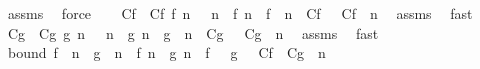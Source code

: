 \begin{isabellebody}
\ assms\ \isamarkupfalse%
\ force\isanewline
\isanewline
\ \ \isamarkupfalse%
\ C{\isacharunderscore}{\kern0pt}f\ \ C{\isacharunderscore}{\kern0pt}f{\isacharcolon}{\kern0pt}\ {\isachardoublequoteopen}{\isasymbar}f\ {\isacharparenleft}{\kern0pt}n\ {\isacharplus}{\kern0pt}\ {\isacharparenleft}{\kern0pt}{\isacharminus}{\kern0pt}\ n{\isacharparenright}{\kern0pt}{\isacharparenright}{\kern0pt}\ {\isacharminus}{\kern0pt}\ {\isacharparenleft}{\kern0pt}f\ n\ {\isacharplus}{\kern0pt}\ f\ {\isacharparenleft}{\kern0pt}{\isacharminus}{\kern0pt}\ n{\isacharparenright}{\kern0pt}{\isacharparenright}{\kern0pt}{\isasymbar}\ {\isasymle}\ C{\isacharunderscore}{\kern0pt}f{\isachardoublequoteclose}\ {\isachardoublequoteopen}{}\ {\isasymle}\ C{\isacharunderscore}{\kern0pt}f{\isachardoublequoteclose}\ \ n\ \isamarkupfalse%
\ assms\ \isamarkupfalse%
\ fast\isanewline
\isanewline
\ \ \isamarkupfalse%
\ C{\isacharunderscore}{\kern0pt}g\ \ C{\isacharunderscore}{\kern0pt}g{\isacharcolon}{\kern0pt}\ {\isachardoublequoteopen}{\isasymbar}g\ {\isacharparenleft}{\kern0pt}n\ {\isacharplus}{\kern0pt}\ {\isacharparenleft}{\kern0pt}{\isacharminus}{\kern0pt}\ n{\isacharparenright}{\kern0pt}{\isacharparenright}{\kern0pt}\ {\isacharminus}{\kern0pt}\ {\isacharparenleft}{\kern0pt}g\ n\ {\isacharplus}{\kern0pt}\ g\ {\isacharparenleft}{\kern0pt}{\isacharminus}{\kern0pt}\ n{\isacharparenright}{\kern0pt}{\isacharparenright}{\kern0pt}{\isasymbar}\ {\isasymle}\ C{\isacharunderscore}{\kern0pt}g{\isachardoublequoteclose}\ {\isachardoublequoteopen}{}\ {\isasymle}\ C{\isacharunderscore}{\kern0pt}g{\isachardoublequoteclose}\ \ n\ \isamarkupfalse%
\ assms\ \isamarkupfalse%
\ fast\isanewline
\ \ \isanewline
\ \ \isamarkupfalse%
\ bound{\isacharcolon}{\kern0pt}\ {\isachardoublequoteopen}{\isasymbar}f\ {\isacharparenleft}{\kern0pt}{\isacharminus}{\kern0pt}\ n{\isacharparenright}{\kern0pt}\ {\isacharminus}{\kern0pt}\ g\ {\isacharparenleft}{\kern0pt}{\isacharminus}{\kern0pt}\ n{\isacharparenright}{\kern0pt}{\isasymbar}\ {\isasymle}\ {\isasymbar}f\ n\ {\isacharminus}{\kern0pt}\ g\ n{\isasymbar}\ {\isacharplus}{\kern0pt}\ {\isasymbar}f\ {}{\isasymbar}\ {\isacharplus}{\kern0pt}\ {\isasymbar}g\ {}{\isasymbar}\ {\isacharplus}{\kern0pt}\ C{\isacharunderscore}{\kern0pt}f\ {\isacharplus}{\kern0pt}\ C{\isacharunderscore}{\kern0pt}g{\isachardoublequoteclose}\ \ n\ \isamarkupfalse%

\end{isabellebody}

